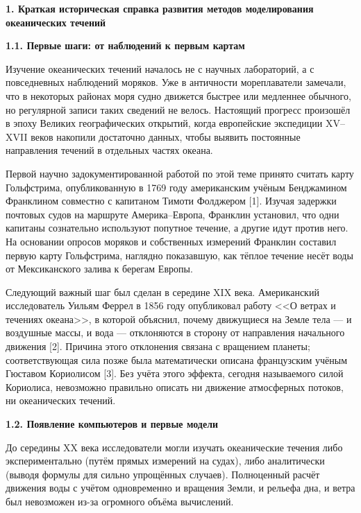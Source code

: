 \documentclass[a4paper,14pt]{extarticle}
\begin{document}
\newpage


\begin{center}
    \textbf{\large 1. Краткая историческая справка развития методов моделирования океанических течений}
\end{center}

\noindent \textbf{1.1. Первые шаги: от наблюдений к первым картам}

\noindent Изучение океанических течений началось не с научных лабораторий, а с повседневных наблюдений моряков. Уже в античности мореплаватели замечали, что в некоторых районах моря судно движется быстрее или медленнее обычного, но регулярной записи таких сведений не велось. Настоящий прогресс произошёл в эпоху Великих географических открытий, когда европейские экспедиции XV--XVII веков накопили достаточно данных, чтобы выявить постоянные направления течений в отдельных частях океана.

\noindent Первой научно задокументированной работой по этой теме принято считать карту Гольфстрима, опубликованную в 1769 году американским учёным Бенджамином Франклином совместно с капитаном Тимоти Фолджером [1]. Изучая задержки почтовых судов на маршруте Америка--Европа, Франклин установил, что одни капитаны сознательно используют попутное течение, а другие идут против него. На основании опросов моряков и собственных измерений Франклин составил первую карту Гольфстрима, наглядно показавшую, как тёплое течение несёт воды от Мексиканского залива к берегам Европы.

\noindent Следующий важный шаг был сделан в середине XIX века. Американский исследователь Уильям Феррел в 1856 году опубликовал работу <<О ветрах и течениях океана>>, в которой объяснил, почему движущиеся на Земле тела — и воздушные массы, и вода — отклоняются в сторону от направления начального движения [2]. Причина этого отклонения связана с вращением планеты; соответствующая сила позже была математически описана французским учёным Гюставом Кориолисом [3]. Без учёта этого эффекта, сегодня называемого силой Кориолиса, невозможно правильно описать ни движение атмосферных потоков, ни океанических течений.

\vspace{\baselineskip}

\noindent \textbf{1.2. Появление компьютеров и первые модели}

\noindent До середины XX века исследователи могли изучать океанические течения либо экспериментально (путём прямых измерений на судах), либо аналитически (выводя формулы для сильно упрощённых случаев). Полноценный расчёт движения воды с учётом одновременно и вращения Земли, и рельефа дна, и ветра был невозможен из-за огромного объёма вычислений.
\end{document}
